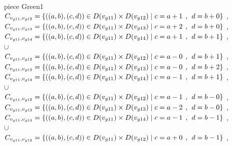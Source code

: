 \\ piece Green1 
\\$C_{v_{g11},v_{g12}}=\{((a,b),(c,d))\in D(v_{g11}) \times D(v_{g12})\mid c = a + 1\hspace{1ex} , \hspace{1ex}  d = b + 0 \}$ , 
\\$C_{v_{g11},v_{g13}}=\{((a,b),(c,d))\in D(v_{g11}) \times D(v_{g13})\mid c = a + 2\hspace{1ex} , \hspace{1ex}  d = b + 0 \}$ , 
\\$C_{v_{g11},v_{g14}}=\{((a,b),(c,d))\in D(v_{g11}) \times D(v_{g14})\mid c = a + 1\hspace{1ex} , \hspace{1ex}  d = b + 1 \}$ , 
\\$\cup$
\\$C_{v_{g11},v_{g12}}=\{((a,b),(c,d))\in D(v_{g11}) \times D(v_{g12})\mid c = a - 0\hspace{1ex} , \hspace{1ex}  d = b + 1 \}$ , 
\\$C_{v_{g11},v_{g13}}=\{((a,b),(c,d))\in D(v_{g11}) \times D(v_{g13})\mid c = a - 0\hspace{1ex} , \hspace{1ex}  d = b + 2 \}$ , 
\\$C_{v_{g11},v_{g14}}=\{((a,b),(c,d))\in D(v_{g11}) \times D(v_{g14})\mid c = a - 1\hspace{1ex} , \hspace{1ex}  d = b + 1 \}$ , 
\\$\cup$
\\$C_{v_{g11},v_{g12}}=\{((a,b),(c,d))\in D(v_{g11}) \times D(v_{g12})\mid c = a - 1\hspace{1ex} , \hspace{1ex}  d = b - 0 \}$ , 
\\$C_{v_{g11},v_{g13}}=\{((a,b),(c,d))\in D(v_{g11}) \times D(v_{g13})\mid c = a - 2\hspace{1ex} , \hspace{1ex}  d = b - 0 \}$ , 
\\$C_{v_{g11},v_{g14}}=\{((a,b),(c,d))\in D(v_{g11}) \times D(v_{g14})\mid c = a - 1\hspace{1ex} , \hspace{1ex}  d = b - 1 \}$ , 
\\$\cup$
\\$C_{v_{g11},v_{g12}}=\{((a,b),(c,d))\in D(v_{g11}) \times D(v_{g12})\mid c = a + 0\hspace{1ex} , \hspace{1ex}  d = b - 1 \}$ , 
